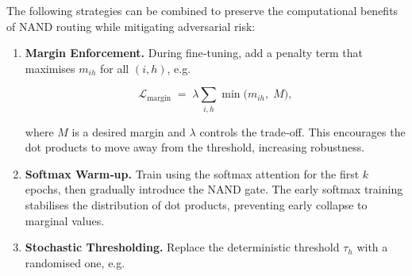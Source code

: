The following strategies can be combined to preserve the computational benefits of NAND routing while mitigating adversarial risk:













\begin{enumerate}






\item \textbf{Margin Enforcement.}  During fine‑tuning, add a penalty term that maximises $m_{ih}$ for all $(i,h)$, e.g.






\[






\mathcal{L}_{\text{margin}}






  \;=\;\lambda\!\sum_{i,h} \min\!\bigl(m_{ih},\;M\bigr),






\]






where $M$ is a desired margin and $\lambda$ controls the trade‑off.  This encourages the dot products to move away from the threshold, increasing robustness.













\item \textbf{Softmax Warm‑up.}  Train using the softmax attention for the first $k$ epochs, then gradually introduce the NAND gate.  The early softmax training stabilises the distribution of dot products, preventing early collapse to marginal values.













\item \textbf{Stochastic Thresholding.}  Replace the deterministic threshold $\tau_h$ with a randomised one, e.g.







\end{enumerate}
